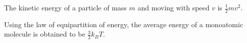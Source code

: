 The kinetic energy of a particle of mass $m$ and moving with speed $v$ is $\frac{1}{2}mv^2$.

Using the law of equipartition of energy, the average energy of a monoatomic molecule is obtained to be $\tfrac{3}{2}k_BT$.